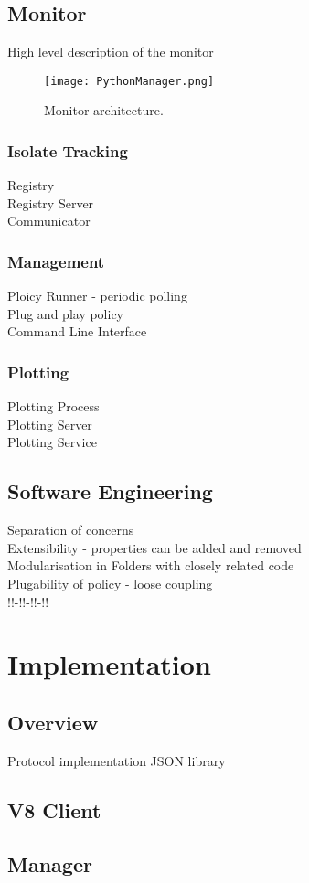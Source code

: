 \documentclass{l4proj}
\begin{document}
\section{Monitor}
High level description of the monitor 

\begin{figure}[!ht]
  \centering
    \texttt{[image: PythonManager.png]}
	\caption{Monitor architecture.}
\end{figure}
\subsection{Isolate Tracking}
Registry\\
Registry Server\\
Communicator
\subsection{Management}
Ploicy Runner - periodic polling\\
Plug and play policy\\
Command Line Interface
\subsection{Plotting}
Plotting Process\\
Plotting Server\\
Plotting Service
\section{Software Engineering}
Separation of concerns\\
Extensibility - properties can be added and removed\\
Modularisation in Folders with closely related code\\
Plugability of policy - loose coupling\\
!!-!!-!!-!!
\newpage
\chapter{Implementation}
\section{Overview}
Protocol implementation
JSON library
\section{V8 Client}
\section{Manager}
\end{document}
